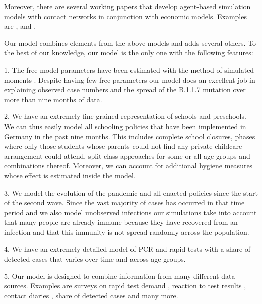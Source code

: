 Moreover, there are several working papers that develop agent-based simulation models
with contact networks in conjunction with economic models. Examples are
\citet{Basurto2020}, \citet{DelliGatti2020} and \citet{Mellacher2020}.

Our model combines elements from the above models and adds several others. To the best of
our knowledge, our model is the only one with the following features:

1. The free model parameters have been estimated with the method of simulated moments
   \citep{McFadden1989}. Despite having few free parameters our model does an excellent
   job in explaining observed case numbers and the spread of the B.1.1.7 mutation over
   more than nine months of data.

2. We have an extremely fine grained representation of schools and preschools. We can
   thus easily model all schooling policies that have been implemented in Germany in the
   past nine months. This includes complete school closures, phases where only those
   students whose parents could not find any private childcare arrangement could attend,
   split class approaches for some or all age groups and combinations thereof. Moreover,
   we can account for additional hygiene measures whose effect is estimated inside the
   model.

3. We model the evolution of the pandemic and all enacted policies since the start of the
   second wave. Since the vast majority of cases has occurred in that time period and we
   also model unobserved infections our simulations take into account that many people
   are already immune because they have recovered from an infection and that this
   immunity is not spread randomly across the population.

4. We have an extremely detailed model of PCR and rapid tests with a share of detected
   cases that varies over time and across age groups.

5. Our model is designed to combine information from many different data sources.
   Examples are surveys on rapid test demand \citep{Betsch2021}, reaction to test results
   \citep{Betsch2021}, contact diaries \citep{Mossong2008}, share of detected cases
   \citep{Dunkelzifferradar2020} and many more.
